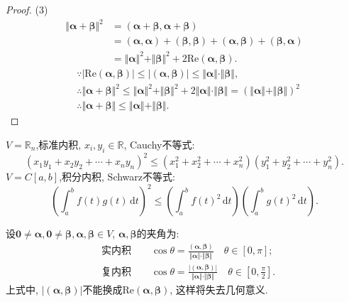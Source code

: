 \begin{proof}
  (3)
  \begin{align*}
    \Vert\bm{\alpha}+\bm{\beta}\Vert^2 & =
        (\bm{\alpha}+\bm{\beta},\bm{\alpha}+\bm{\beta})\\
                                       & = (\bm{\alpha},\bm{\alpha})+(\bm{\beta},\bm{\beta})+
                                         (\bm{\alpha},\bm{\beta})+(\bm{\beta},\bm{\alpha})\\
                                       & = \Vert\bm{\alpha}\Vert^2+\Vert\bm{\beta}\Vert^2
                                         +2\mathrm{Re}(\bm{\alpha},\bm{\beta}).
  \end{align*}
  \begin{align*}
    & \because |\mathrm{Re}(\bm{\alpha},\bm{\beta})| \leq |(\bm{\alpha},\bm{\beta})|
      \leq \Vert\bm{\alpha}\Vert\cdot\Vert\bm{\beta}\Vert,\\
    & \therefore \Vert\bm{\alpha}+\bm{\beta}\Vert^2 \leq
      \Vert\bm{\alpha}\Vert^2+\Vert\bm{\beta}\Vert^2 +
      2\Vert\bm{\alpha}\Vert\cdot\Vert\bm{\beta}\Vert =
      (\Vert\bm{\alpha}\Vert+\Vert\bm{\beta}\Vert)^2\\
    & \therefore \Vert\bm{\alpha} + \bm{\beta}\Vert \leq
      \Vert\bm{\alpha}\Vert + \Vert\bm{\beta}\Vert.
  \end{align*}
\end{proof}

\begin{example}
  $V=\mathbb{R}_n$,标准内积, $x_i,y_i \in \mathbb{R}$, 
  Cauchy不等式:
  \[ (x_1y_1+x_2y_2+\cdots+x_ny_n)^2 \leq
    (x_1^2+x_2^2+\cdots+x_n^2)(y_1^2+y_2^2+\cdots+y_n^2).\]
  $V=C[a,b]$,积分内积, Schwarz不等式:
  \[
    \left( \int_{a}^{b} f(t)g(t) \, \mathrm{d}t \right)^2 \leq
    \left( \int_{a}^{b} f(t)^2 \, \mathrm{d}t \right) \left( \int_{a}^{b} g(t)^2 \, \mathrm{d}t \right).
\]
\end{example}

\begin{definition}
  设$\bm{0} \neq \bm{\alpha}, \bm{0} \neq \bm{\beta},
  \bm{\alpha},\bm{\beta} \in V$, $\bm{\alpha},\bm{\beta}$的夹角为:
  \begin{align*}
    & \text{实内积}\qquad  \cos\theta =
      \frac{(\bm{\alpha},\bm{\beta})}{\Vert\bm{\alpha}\Vert\cdot\Vert\bm{\beta}\Vert}
      \quad \theta\in [0,\pi];\\
    & \text{复内积}\qquad  \cos\theta =
      \frac{|(\bm{\alpha},\bm{\beta})|}{\Vert\bm{\alpha}\Vert\cdot\Vert\bm{\beta}\Vert}
      \quad \theta\in [0,\frac{\pi}{2}].
  \end{align*}
  上式中, $|(\bm{\alpha},\bm{\beta})|$不能换成$\mathrm{Re}(\bm{\alpha},\bm{\beta})$,
  这样将失去几何意义.
\end{definition}

